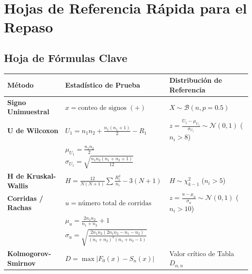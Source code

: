 \documentclass[11pt,a4paper]{article}
\begin{document}
\newpage
\section{Hojas de Referencia Rápida para el Repaso}

\subsection{Hoja de Fórmulas Clave}
\begin{table}[h!]
    \centering
    \small
    \begin{tabular}{lll}
        \toprule
        \textbf{Método} & \textbf{Estadístico de Prueba} & \textbf{Distribución de Referencia} \\
        \midrule
        \textbf{Signo Unimuestral} & $x = \text{conteo de signos } (+)$ & $X \sim \mathcal{B}(n, p=0.5)$ \\
        \textbf{U de Wilcoxon} & $U_1 = n_1 n_2 + \frac{n_1(n_1+1)}{2} - R_1$ & $z = \frac{U_1 - \mu_{U_1}}{\sigma_{U_1}} \sim \mathcal{N}(0, 1)$ ($n_i > 8$) \\
         & $\mu_{U_1} = \frac{n_1 n_2}{2}$ \quad $\sigma_{U_1} = \sqrt{\frac{n_1 n_2 (n_1+n_2+1)}{12}}$ & \\
        \textbf{H de Kruskal-Wallis} & $H = \frac{12}{N(N+1)} \sum \frac{R_i^2}{n_i} - 3(N+1)$ & $H \sim \chi^2_{k-1}$ ($n_i > 5$) \\
        \textbf{Corridas / Rachas} & $u = \text{número total de corridas}$ & $z = \frac{u - \mu_u}{\sigma_u} \sim \mathcal{N}(0, 1)$ ($n_i > 10$) \\
         & $\mu_u = \frac{2 n_1 n_2}{n_1+n_2} + 1$ & \\
         & $\sigma_u = \sqrt{\frac{2 n_1 n_2 (2 n_1 n_2 - n_1 - n_2)}{(n_1+n_2)^2 (n_1+n_2-1)}}$ & \\
        \textbf{Kolmogorov-Smirnov} & $D = \max |F_0(x) - S_n(x)|$ & Valor crítico de Tabla $D_{\alpha, n}$ \\
        \bottomrule
    \end{tabular}
\end{table}
\end{document}
